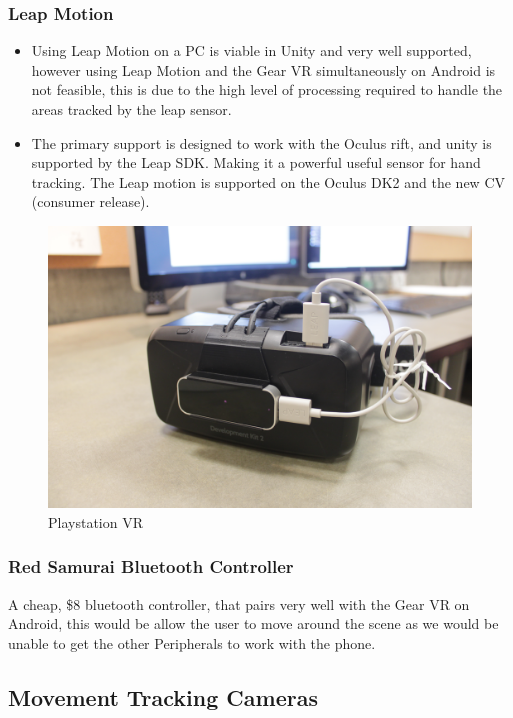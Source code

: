 \documentclass[a4paper,10pt]{article}
\begin{document}
\subsubsection{Leap Motion}
\begin{itemize}
	\item Using Leap Motion on a PC is viable in Unity and very well supported, however using Leap Motion and the Gear VR simultaneously on Android is not feasible, this is due to the high level of processing required to
	handle the areas tracked by the leap sensor. 
	\item The primary support is designed to work with the Oculus rift, and unity is supported by the Leap SDK. Making it a powerful useful sensor for hand tracking. The 
	Leap motion is supported on the Oculus DK2 and the new CV (consumer release). 
\end{itemize}
\begin{figure}[H]
	\centerline{\includegraphics[scale= 0.08]{leap.jpg}}
	\caption{Playstation VR}
	\label{fig:leapImg}
\end{figure}
	
	
\subsubsection{Red Samurai Bluetooth Controller}
	A cheap, \$8 bluetooth controller, that pairs very well with the Gear VR on Android, this would be allow the user to move around the scene as we would be unable to get the other Peripherals to work with the phone.
\pagebreak
\subsection{Movement Tracking Cameras}
\end{document}
